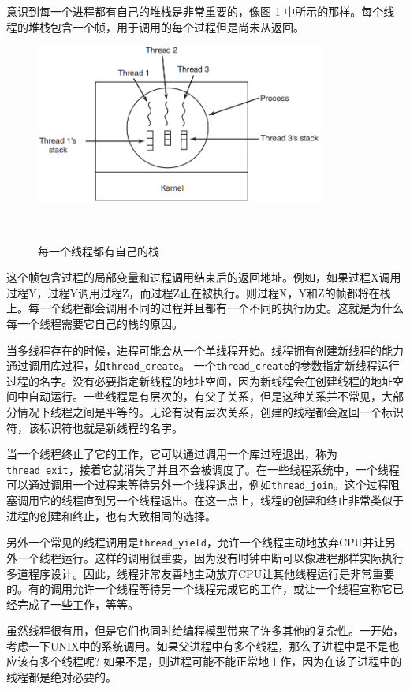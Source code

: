 	意识到每一个进程都有自己的堆栈是非常重要的，像图 \ref{fig:threadstack} 中所示的那样。每个线程的堆栈包含一个帧，用于调用的每个过程但是尚未从返回。
	
	\begin{figure}[ht]\small
		\centering
		\includegraphics[width=0.85\textwidth]{FIG/2-13.png}
		\caption{每一个线程都有自己的栈}　\label{fig:threadstack}
	\end{figure}

	这个帧包含过程的局部变量和过程调用结束后的返回地址。例如，如果过程X调用过程Y，过程Y调用过程Z，而过程Z正在被执行。则过程X，Y和Z的帧都将在栈上。每一个线程都会调用不同的过程并且都有一个不同的执行历史。这就是为什么每一个线程需要它自己的栈的原因。
	
	当多线程存在的时候，进程可能会从一个单线程开始。线程拥有创建新线程的能力通过调用库过程，如\texttt{thread\_create}。
	一个\texttt{thread\_create}的参数指定新线程运行过程的名字。没有必要指定新线程的地址空间，因为新线程会在创建线程的地址空间中自动运行。一些线程是有层次的，有父子关系，但是这种关系并不常见，大部分情况下线程之间是平等的。无论有没有层次关系，创建的线程都会返回一个标识符，该标识符也就是新线程的名字。
	
	当一个线程终止了它的工作，它可以通过调用一个库过程退出，称为\texttt{thread\_exit}，接着它就消失了并且不会被调度了。在一些线程系统中，一个线程可以通过调用一个过程来等待另外一个线程退出，例如\texttt{thread\_join}。这个过程阻塞调用它的线程直到另一个线程退出。在这一点上，线程的创建和终止非常类似于进程的创建和终止，也有大致相同的选择。
	
	另外一个常见的线程调用是\texttt{thread\_yield}，允许一个线程主动地放弃CPU并让另外一个线程运行。这样的调用很重要，因为没有时钟中断可以像进程那样实际执行多道程序设计。因此，线程非常友善地主动放弃CPU让其他线程运行是非常重要的。有的调用允许一个线程等待另一个线程完成它的工作，或让一个线程宣称它已经完成了一些工作，等等。
	
	虽然线程很有用，但是它们也同时给编程模型带来了许多其他的复杂性。一开始，考虑一下UNIX中的系统调用。如果父进程中有多个线程，那么子进程中是不是也应该有多个线程呢? 如果不是，则进程可能不能正常地工作，因为在该子进程中的线程都是绝对必要的。
	
